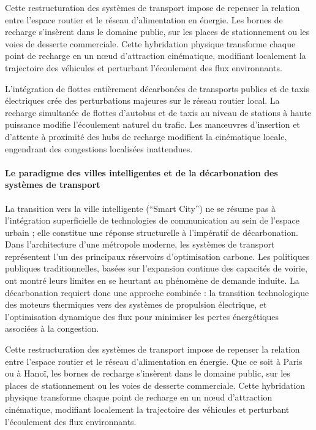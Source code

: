 \documentclass[10pt, a4paper]{article}
\begin{document}
Cette restructuration des systèmes de transport impose de repenser la
relation entre l'espace routier et le réseau d'alimentation en énergie.
Les bornes de recharge s'insèrent dans le domaine public, sur les places
de stationnement ou les voies de desserte commerciale. Cette hybridation
physique transforme chaque point de recharge en un nœud d'attraction
cinématique, modifiant localement la trajectoire des véhicules et
perturbant l'écoulement des flux environnants.

L'intégration de flottes entièrement décarbonées de transports publics
et de taxis électriques crée des perturbations majeures sur le réseau
routier local. La recharge simultanée de flottes d'autobus et de taxis
au niveau de stations à haute puissance modifie l'écoulement naturel du
trafic. Les manœuvres d'insertion et d'attente à proximité des hubs de
recharge modifient la cinématique locale, engendrant des congestions
localisées inattendues.

\paragraph{Le paradigme des villes intelligentes et de la décarbonation
des systèmes de
transport}\label{le-paradigme-des-villes-intelligentes-et-de-la-duxe9carbonation-des-systuxe8mes-de-transport}

La transition vers la ville intelligente (``Smart City'') ne se résume
pas à l'intégration superficielle de technologies de communication au
sein de l'espace urbain ; elle constitue une réponse structurelle à
l'impératif de décarbonation. Dans l'architecture d'une métropole
moderne, les systèmes de transport représentent l'un des principaux
réservoirs d'optimisation carbone. Les politiques publiques
traditionnelles, basées sur l'expansion continue des capacités de
voirie, ont montré leurs limites en se heurtant au phénomène de demande
induite. La décarbonation requiert donc une approche combinée : la
transition technologique des moteurs thermiques vers des systèmes de
propulsion électrique, et l'optimisation dynamique des flux pour
minimiser les pertes énergétiques associées à la congestion.

Cette restructuration des systèmes de transport impose de repenser la
relation entre l'espace routier et le réseau d'alimentation en énergie.
Que ce soit à Paris ou à Hanoï, les bornes de recharge s'insèrent dans
le domaine public, sur les places de stationnement ou les voies de
desserte commerciale. Cette hybridation physique transforme chaque point
de recharge en un nœud d'attraction cinématique, modifiant localement la
trajectoire des véhicules et perturbant l'écoulement des flux
environnants.
\end{document}
